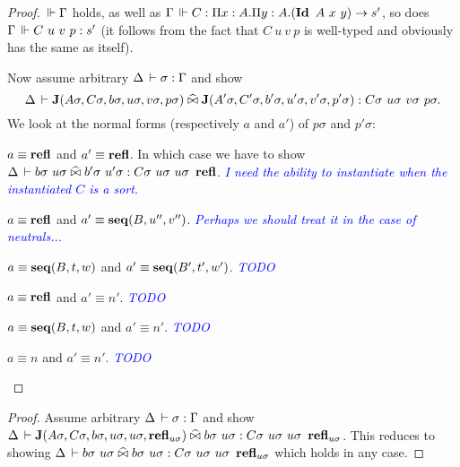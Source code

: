 \documentclass[a4paper,english]{lipics-utf8x}
\newcommand\meta[1]{\noindent\textcolor{blue}{\emph{#1}}}
\begin{document}
  \begin{proof}
    $\,\Vdash \Gamma$ holds, as well as
    $\Gamma \,\Vdash C : \Pi x:A. \Pi y:A. (\operatorname{\mathbf{Id}~} A\ x\ y) \to s'$,
    so does $\Gamma \,\Vdash C\ u\ v\ p : s'$ (it follows from the fact that
    $C\ u\ v\ p$ is well-typed and obviously has the same as itself).

    Now assume arbitrary $\Delta \,\vdash \sigma : \Gamma$ and show
    \[\Delta \,\vdash \operatorname{\mathbf{J}}(A \sigma, C \sigma, b \sigma, u \sigma, v \sigma, p \sigma)
    \mathrel{\widehat{\bowtie}} \operatorname{\mathbf{J}}(A' \sigma, C' \sigma, b' \sigma, u' \sigma, v' \sigma, p' \sigma) :
    C \sigma\ u \sigma\ v \sigma\ p \sigma.\]
    We look at the normal forms (respectively $a$ and $a'$) of $p \sigma$ and
    $p' \sigma$:
    \begin{caselist}
      \nextcase $a \equiv \operatorname{\mathbf{refl}}$ and $a' \equiv \operatorname{\mathbf{refl}}$.
      In which case we have to show
      $\Delta \,\vdash b \sigma\ u\sigma \mathrel{\widehat{\bowtie}} b'\sigma\ u'\sigma :
      C \sigma\ u \sigma\ u \sigma\ \operatorname{\mathbf{refl}}$.
      \meta{I need the ability to instantiate when the instantiated $C$ is a
      sort.}

      \nextcase $a \equiv \operatorname{\mathbf{refl}}$ and $a' \equiv \operatorname{\mathbf{seq}}(B,u'',v'')$.
      \meta{Perhaps we should treat it in the case of neutrals...}

      \nextcase $a \equiv \operatorname{\mathbf{seq}}(B,t,w)$ and $a' \equiv \operatorname{\mathbf{seq}}(B',t',w')$.
      \meta{TODO}

      \nextcase $a \equiv \operatorname{\mathbf{refl}}$ and $a' \equiv n'$.
      \meta{TODO}

      \nextcase $a \equiv \operatorname{\mathbf{seq}}(B,t,w)$ and $a' \equiv n'$.
      \meta{TODO}

      \nextcase $a \equiv n$ and $a' \equiv n'$.
      \meta{TODO}
    \end{caselist}
  \end{proof}

  \begin{lemma}
    \leavevmode
    \begin{mathc}
    \end{mathc}
  \end{lemma}

  \begin{proof}
    Assume arbitrary $\Delta \,\vdash \sigma : \Gamma$ and show
    $\Delta \der \J (A\sigma,C\sigma,b\sigma,u\sigma,u\sigma,\refl_{u\sigma})
    \hEr b\sigma\ u\sigma : C\sigma\ u\sigma\ u\sigma\ \refl_{u\sigma}$.
    This reduces to showing
    $\Delta \der b\sigma\ u\sigma
    \hEr b\sigma\ u\sigma : C\sigma\ u\sigma\ u\sigma\ \refl_{u\sigma}$
    which holds in any case.
  \end{proof}
\end{document}
